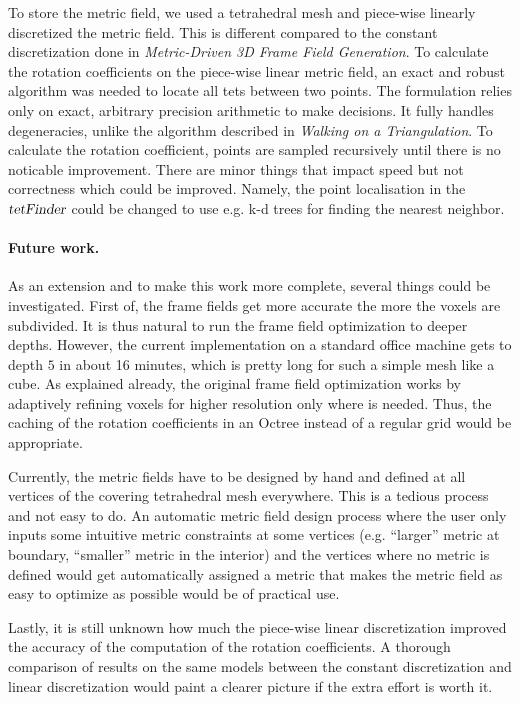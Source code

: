 \documentclass[a4paper,twoside,openright,11pt]{report}
\newcommand{\op}[1]{\textsl{#1}}
\begin{document}
To store the metric field, we used a tetrahedral mesh and piece-wise
linearly discretized the metric field. This is different compared
to the constant discretization done in \emph{Metric-Driven 3D Frame Field Generation}\cite{Fang23}.
To calculate the rotation coefficients on the piece-wise linear metric field,
an exact and robust algorithm was needed to locate all tets between two points.
The formulation relies only on exact, arbitrary precision arithmetic to make decisions.
It fully handles degeneracies, unlike the algorithm described in \emph{Walking on a Triangulation}\cite{Devillers}.
To calculate the rotation coefficient, points are sampled recursively
until there is no noticable improvement.
There are minor things that impact speed but not
correctness which could be improved. Namely, the point localisation
in the $\op{tetFinder}$ could be changed to use e.g. k-d trees for
finding the nearest neighbor.


\paragraph{Future work.}
As an extension and to make this work more complete, several things
could be investigated.
First of, the frame fields get more accurate the more the voxels are
subdivided. It is thus natural to run the frame field optimization to
deeper depths. However, the current implementation on a standard office machine gets to depth $5$ in about 16 minutes,
which is pretty long for such a simple mesh like a cube.
As explained already, the original frame field optimization works by
adaptively refining voxels for higher resolution only where is needed.
Thus, the caching of the rotation coefficients in an Octree instead of 
a regular grid would be appropriate.

Currently, the metric fields have to be designed by hand and defined at
all vertices of the covering tetrahedral mesh everywhere.
This is a tedious process and not easy to do.
An automatic metric field design process where the user only inputs some
intuitive metric constraints at some vertices (e.g. ``larger'' metric at boundary, ``smaller'' metric
in the interior) and the vertices where no metric is defined would get
automatically assigned a metric that makes the metric field as easy to
optimize as possible would be of practical use.

Lastly, it is still unknown how much the piece-wise linear
discretization improved the accuracy of the computation of the rotation
coefficients.
A thorough comparison of results on the same models between the
constant discretization \cite{Fang23}
and linear discretization would paint a clearer picture if the extra
effort is worth it. 
\end{document}
